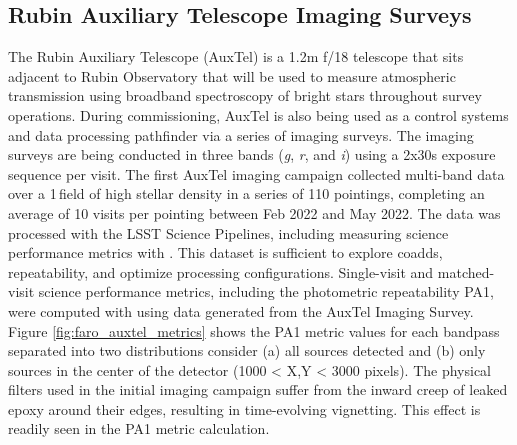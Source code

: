 \subsection{Rubin Auxiliary Telescope Imaging Surveys} \label{ssec:auxtel}

The Rubin Auxiliary Telescope\cite{10.1117/12.2561112} (AuxTel) is a 1.2m f/18 telescope that sits adjacent to Rubin Observatory that will be used to measure atmospheric transmission using broadband spectroscopy of bright stars throughout survey operations. 
During commissioning, AuxTel is also being used as a control systems and data processing pathfinder via a series of imaging surveys. The imaging surveys are being conducted in three bands (\emph{g}, \emph{r}, and \emph{i}) using a 2x30s exposure sequence per visit.
The first AuxTel imaging campaign collected multi-band data over a 1\,\degsq field of high stellar density in a series of 110 pointings, completing an average of 10 visits per pointing between Feb 2022 and May 2022. The data was processed with the LSST Science Pipelines, including measuring science performance metrics with \faro. This dataset is sufficient to explore coadds, repeatability, and optimize processing configurations.
Single-visit and matched-visit science performance metrics, including the photometric repeatability PA1, were computed with \faro using data generated from the AuxTel Imaging Survey.
Figure \ref{fig:faro_auxtel_metrics} shows the PA1 metric values for each bandpass separated into two distributions consider (a) all sources detected and (b) only sources in the center of the detector (1000 < X,Y < 3000 pixels). The physical filters used in the initial imaging campaign suffer from the inward creep of leaked epoxy around their edges, resulting in time-evolving vignetting. This effect is readily seen in the PA1 metric calculation.

